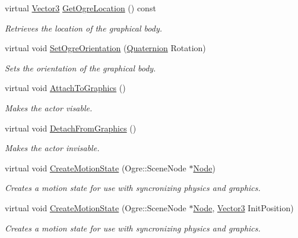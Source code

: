 \begin{DoxyCompactItemize}
virtual \hyperlink{classphys_1_1Vector3}{Vector3} \hyperlink{classphys_1_1ActorBase_a12ef0a2625e2fdf506ea8e23e0a378fa}{GetOgreLocation} () const 
\begin{DoxyCompactList}\small\item\em Retrieves the location of the graphical body. \item\end{DoxyCompactList}\item 
virtual void \hyperlink{classphys_1_1ActorBase_a7b2d13cb1e8bba60eeae782a53fd5e49}{SetOgreOrientation} (\hyperlink{classphys_1_1Quaternion}{Quaternion} Rotation)
\begin{DoxyCompactList}\small\item\em Sets the orientation of the graphical body. \item\end{DoxyCompactList}\item 
virtual void \hyperlink{classphys_1_1ActorBase_a45f190cb9b647bb3385d1298f9dab589}{AttachToGraphics} ()
\begin{DoxyCompactList}\small\item\em Makes the actor visable. \item\end{DoxyCompactList}\item 
virtual void \hyperlink{classphys_1_1ActorBase_acc352d14b6d7f15694ea108ec1c281ec}{DetachFromGraphics} ()
\begin{DoxyCompactList}\small\item\em Makes the actor invisable. \item\end{DoxyCompactList}\item 
virtual void \hyperlink{classphys_1_1ActorBase_a23e6edcd5c18b89c40abf02feba6bc11}{CreateMotionState} (Ogre::SceneNode $\ast$\hyperlink{classNode}{Node})
\begin{DoxyCompactList}\small\item\em Creates a motion state for use with syncronizing physics and graphics. \item\end{DoxyCompactList}\item 
virtual void \hyperlink{classphys_1_1ActorBase_a5bc2f834d7994c3c6a9408f4ff699f59}{CreateMotionState} (Ogre::SceneNode $\ast$\hyperlink{classNode}{Node}, \hyperlink{classphys_1_1Vector3}{Vector3} InitPosition)
\begin{DoxyCompactList}\small\item\em Creates a motion state for use with syncronizing physics and graphics. \item\end{DoxyCompactList}\item 

\end{DoxyCompactItemize}
